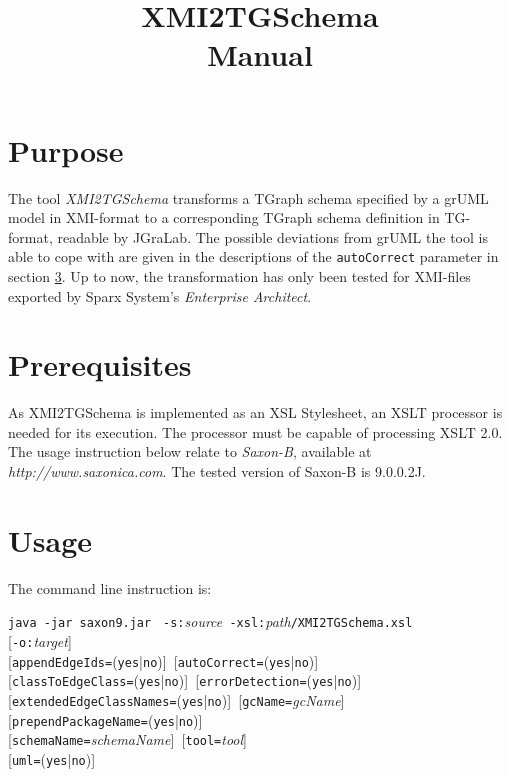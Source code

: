 \documentclass[a4paper]{article}
\title{\LARGE XMI2TGSchema\\Manual}
\begin{document}
	\maketitle
	\vspace{-6pt}
	
	\section{Purpose}
	The tool \emph{XMI2TGSchema} transforms a TGraph schema specified by a grUML model in XMI-format to a corresponding TGraph schema definition in TG-format, readable by JGraLab. The possible deviations from grUML the tool is able to cope with are given in the descriptions of the \texttt{autoCorrect} parameter in section \ref{sec:Usage}. Up to now, the transformation has only been tested for XMI-files exported by Sparx System's \emph{Enterprise Architect}.
	
	\section{Prerequisites}
	As XMI2TGSchema is implemented as an XSL Stylesheet, an XSLT processor is needed for its execution. The processor must be capable of processing XSLT 2.0. The usage instruction below relate to \emph{Saxon-B}, available at \emph{http://www.saxonica.com}. The tested version of Saxon-B is 9.0.0.2J.
	
	\section{Usage} \label{sec:Usage}
	The command line instruction is:
	
	\texttt{java -jar saxon9.jar } \texttt{-s:}\emph{source}\texttt{ -xsl:}\emph{path}\texttt{/XMI2TGSchema.xsl} \\
	\mbox{[}\texttt{-o:}\emph{target}] \\
	\mbox{[}\texttt{appendEdgeIds=}(\texttt{yes}|\texttt{no})]\texttt{ }[\texttt{autoCorrect=}(\texttt{yes}|\texttt{no})] \\
	\mbox{[}\texttt{classToEdgeClass=}(\texttt{yes}|\texttt{no})]\texttt{ }[\texttt{errorDetection=}(\texttt{yes}|\texttt{no})] \\
	\mbox{[}\texttt{extendedEdgeClassNames=}(\texttt{yes}|\texttt{no})]\texttt{ }[\texttt{gcName=}\emph{gcName}] \\
	\mbox{[}\texttt{prependPackageName=}(\texttt{yes}|\texttt{no})] \\
	\mbox{[}\texttt{schemaName=}\emph{schemaName}]\texttt{ }[\texttt{tool=}\emph{tool}] \\
	\mbox{[}\texttt{uml=}(\texttt{yes}|\texttt{no})] \\
	
\end{document}
